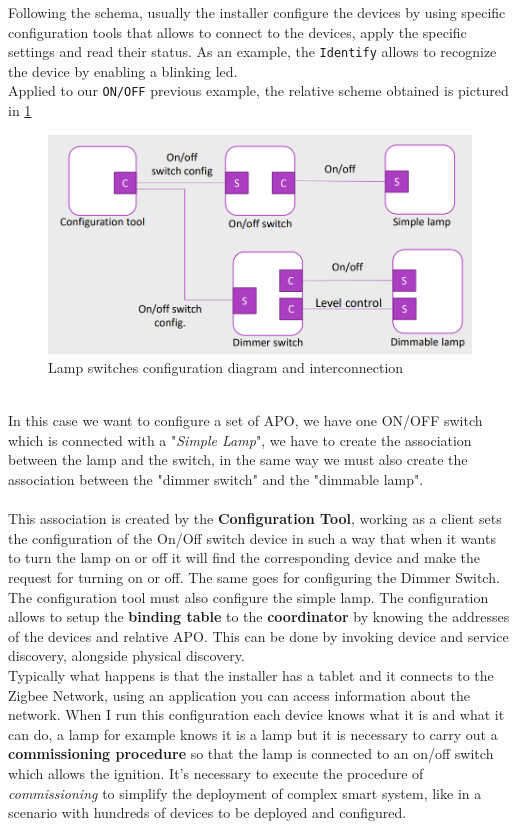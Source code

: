 \documentclass[10pt,a4paper]{report}
\theoremstyle{definition}
\begin{document}
Following the schema, usually the installer configure the devices by using specific configuration tools that allows to connect to the devices, apply the specific settings and read their status. As an example, the \texttt{Identify} allows to recognize the device by enabling a blinking led.\\
Applied to our \texttt{ON/OFF} previous example, the relative scheme obtained is pictured in \ref{zcl-on-off-ex}
\begin{figure}[h!]
	\centering\includegraphics[scale=0.45]{images/Pasted image 20230311165957.png}
	\caption{Lamp switches configuration diagram and interconnection}
	\label{zcl-on-off-ex}
\end{figure}\\
In this case we want to configure a set of APO, we have one
ON/OFF switch which is connected with a "\textit{Simple Lamp}", we have to
create the association between the lamp and the switch, in the same way we must also create the association between the "dimmer switch" and the "dimmable lamp".\\\\
This association is created by the \textbf{Configuration Tool}, working as a client sets the configuration of the On/Off switch device in such a way that when it wants to turn the lamp on or off it will find the corresponding device and make the request for turning on or off. The same goes for configuring the Dimmer Switch. The configuration tool must also configure the simple lamp. The configuration allows to setup the \textbf{binding table} to the \textbf{coordinator} by knowing the addresses of the devices and relative APO. This can be done by invoking device and service discovery, alongside physical discovery.\\
Typically what happens is that the installer has a tablet and it connects to the Zigbee Network, using an application you can access information about the network. When I run this configuration each device knows what it is and what it can do, a lamp for example knows it is a lamp but it is necessary to carry out a \textbf{commissioning procedure} so that the lamp is connected to an on/off switch which allows the ignition. It's necessary to execute the procedure of \textit{commissioning} to simplify the deployment of complex smart system, like in a scenario with hundreds of devices to be deployed and configured.\\
\end{document}
